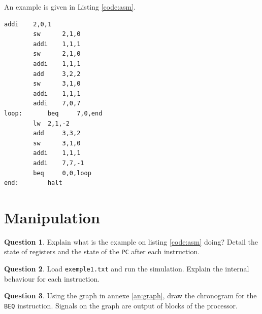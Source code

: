 \documentclass[10pt,a4paper]{article}
\theoremstyle{definition}%
\newtheorem{Q}{Question}[] %
\begin{document}
An example is given in Listing \vref{code:asm}.

\lstset{numbers=left, numberstyle=\tiny, stepnumber=5, numbersep=5pt, captionpos=b,style=customasm}
\begin{lstlisting}[float=h!,caption=Example code,label=code:asm,style=customasm]
		addi 	2,0,1	
		sw   	2,1,0
		addi 	1,1,1
		sw   	2,1,0			
		addi 	1,1,1
		add  	3,2,2
		sw   	3,1,0
		addi 	1,1,1
		addi 	7,0,7	
loop: 		beq  	7,0,end
		lw	2,1,-2
		add 	3,3,2	
		sw   	3,1,0
		addi 	1,1,1
		addi 	7,7,-1
		beq  	0,0,loop
end: 		halt
\end{lstlisting}

\newpage

\section{Manipulation}




\begin{Q}
Explain what is the example on listing \vref{code:asm} doing? Detail the state of registers and the state of the \verb!PC! after each instruction.
\end{Q}

\begin{Q}
Load \verb!exemple1.txt! and run the simulation. Explain the internal behaviour for each instruction.
\end{Q}

\begin{Q}
Using the graph in annexe \vref{an:graph}, draw the chronogram for the \verb!BEQ! instruction. Signals on the graph are output of blocks of the processor.
\end{Q}
\end{document}
